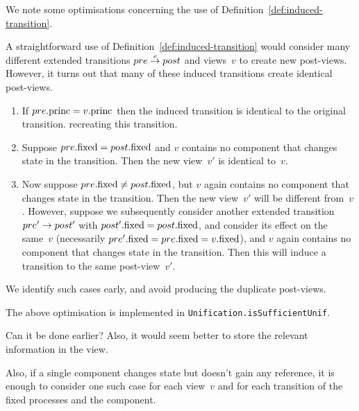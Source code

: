 We note some optimisations concerning the use of
Definition~\ref{def:induced-transition}.  
%
\begin{opt}
\label{opt:avoid-induced}
A straightforward use of Definition~\ref{def:induced-transition} would
consider many different extended transitions $pre \stackrel{e}\rightarrow post$ and
views~$v$ to create new post-views.  However, it turns out that many of these
induced transitions create identical post-views.
%
\begin{enumerate}
\item\label{case:avoid-induced-1} If $pre.\mathrm{princ} = v.\mathrm{princ}$ then the induced
  transition is identical to the original transition. %
  recreating this transition.

\item\label{case:avoid-induced-2} Suppose $pre.\mathrm{fixed} = post.\mathrm{fixed}$ and $v$
  contains no component that changes state in the transition.  Then the new
  view~$v'$ is identical to~$v$.

\item\label{case:avoid-induced-3} Now suppose $pre.\mathrm{fixed} \ne post.\mathrm{fixed}$,
  but $v$ again contains no component that changes state in the transition.
  Then the new view~$v'$ will be different from~$v$.  However, suppose we
  subsequently consider another extended transition $pre' \stackrel{}\rightarrow post'$ with
  $post'.\mathrm{fixed} = post.\mathrm{fixed}$, and consider its effect on the same~$v$
  (necessarily $pre'.\mathrm{fixed} = pre.\mathrm{fixed} = v.\mathrm{fixed}$), and $v$ again contains
  no component that changes state in the transition.  Then this will induce a
  transition to the same post-view~$v'$.
\end{enumerate}

We identify such cases early, and avoid producing the duplicate post-views. 
\end{opt}

\begin{impNote}
The above optimisation is implemented in
\texttt{Unification.isSufficientUnif}.  
\end{impNote}

\begin{improve}
Can it be done earlier?  Also, it would seem better to store the relevant
information in the view.

Also, if a single component changes state but doesn't gain any
reference, it is enough to consider one such case for each view~$v$ and for
each transition of the fixed processes and the component.
\end{improve}


